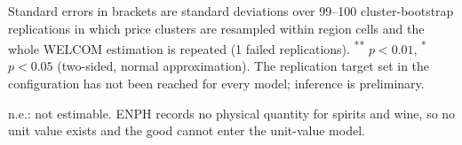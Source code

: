 \begin{table}[!htbp]
\begin{threeparttable}
\begin{tablenotes}[flushleft]
\item Standard errors in brackets are standard deviations over 99--100 cluster-bootstrap replications in which price clusters are resampled within region cells and the whole WELCOM estimation is repeated (1 failed replications). \textsuperscript{**} $p<0.01$, \textsuperscript{*} $p<0.05$ (two-sided, normal approximation). The replication target set in the configuration has not been reached for every model; inference is preliminary.
\item n.e.: not estimable. ENPH records no physical quantity for spirits and wine, so no unit value exists and the good cannot enter the unit-value model.
\end{tablenotes}
\end{threeparttable}
\end{table}
